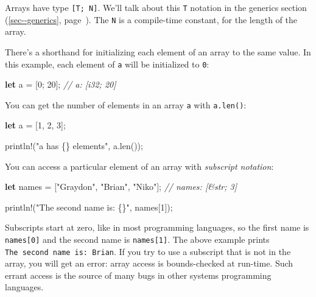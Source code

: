 \documentclass[a4paper,]{book}
\renewcommand*{\hyperref}[2][\ar]{%
  \def\ar{#2}%
  #2 (\autoref{#1}, page~\pageref{#1})}
\newenvironment{Shaded}{\begin{snugshade}}{\end{snugshade}}
\newcommand{\KeywordTok}[1]{\textcolor[rgb]{0.13,0.29,0.53}{\textbf{{#1}}}}
\newcommand{\DecValTok}[1]{\textcolor[rgb]{0.00,0.00,0.81}{{#1}}}
\newcommand{\StringTok}[1]{\textcolor[rgb]{0.31,0.60,0.02}{{#1}}}
\newcommand{\CommentTok}[1]{\textcolor[rgb]{0.56,0.35,0.01}{\textit{{#1}}}}
\newcommand{\OtherTok}[1]{\textcolor[rgb]{0.56,0.35,0.01}{{#1}}}
\newcommand{\NormalTok}[1]{{#1}}
\begin{document}
Arrays have type \texttt{{[}T;\ N{]}}. We'll talk about this \texttt{T}
notation \hyperref[sec--generics]{in the generics section}. The
\texttt{N} is a compile-time constant, for the length of the array.

There's a shorthand for initializing each element of an array to the
same value. In this example, each element of \texttt{a} will be
initialized to \texttt{0}:

\begin{Shaded}
\begin{Highlighting}[]
\KeywordTok{let} \NormalTok{a = [}\DecValTok{0}\NormalTok{; }\DecValTok{20}\NormalTok{]; }\CommentTok{// a: [i32; 20]}
\end{Highlighting}
\end{Shaded}

You can get the number of elements in an array \texttt{a} with
\texttt{a.len()}:

\begin{Shaded}
\begin{Highlighting}[]
\KeywordTok{let} \NormalTok{a = [}\DecValTok{1}\NormalTok{, }\DecValTok{2}\NormalTok{, }\DecValTok{3}\NormalTok{];}

\OtherTok{println!}\NormalTok{(}\StringTok{"a has \{\} elements"}\NormalTok{, a.len());}
\end{Highlighting}
\end{Shaded}

You can access a particular element of an array with \emph{subscript
notation}:

\begin{Shaded}
\begin{Highlighting}[]
\KeywordTok{let} \NormalTok{names = [}\StringTok{"Graydon"}\NormalTok{, }\StringTok{"Brian"}\NormalTok{, }\StringTok{"Niko"}\NormalTok{]; }\CommentTok{// names: [&str; 3]}

\OtherTok{println!}\NormalTok{(}\StringTok{"The second name is: \{\}"}\NormalTok{, names[}\DecValTok{1}\NormalTok{]);}
\end{Highlighting}
\end{Shaded}

Subscripts start at zero, like in most programming languages, so the
first name is \texttt{names{[}0{]}} and the second name is
\texttt{names{[}1{]}}. The above example prints
\texttt{The\ second\ name\ is:\ Brian}. If you try to use a subscript
that is not in the array, you will get an error: array access is
bounds-checked at run-time. Such errant access is the source of many
bugs in other systems programming languages.
\end{document}
